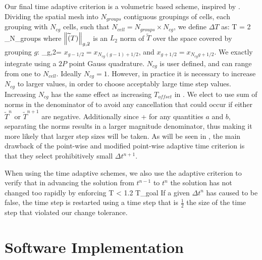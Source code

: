 Our final time adaptive criterion is a volumetric based scheme, inspired by .
Dividing the spatial mesh into $N_{groups}$ contiguous groupings of cells, each grouping with $N_{cg}$ cells, such that $N_{cell} = N_{groups} \times N_{cg}$, we define $\Delta T$ as:
\benum
\Delta T = 2 \max_{N_{groups}}  \pec
\label{eq:volumetric_adaptive}
\eenum
where $\left\lVert  \widetilde(T)  \right\rVert_{g,2}$ is an $L_2$ norm of $\widetilde{T}$ over the space covered by grouping $g$:
\benum
{}_{g,2}= \pec
\label{eq:group_integral}
\eenum
$x_{g-1/2} = x_{N_{cg} (g-1)+1/2}$, and $x_{g+1/2} = x_{N_{cg} g +1/2}$.  
We exactly integrate  using a $2P$ point Gauss quadrature.  
$N_{cg}$ is user defined, and can range from one to $N_{cell}$.
Ideally $N_{cg} = 1$.  However, in practice it is necessary to increase $N_{cg}$ to larger values, in order to choose acceptably large time step values.
Increasing $N_{cg}$ has the same effect as increasing $T_{offset}$ in .
We elect to use sum of norms in the denominator of  to avoid any cancellation that could occur if either $\widetilde{T}^n$ or $\widetilde{T}^{n+1}$ are negative.
Additionally since
\benum
{} \leq {} +  \pec
\eenum
for any quantities $a$ and $b$, separating the norms results in a larger magnitude denominator, thus making it more likely that larger step sizes will be taken.  
As will be seen in , the main drawback of the point-wise and modified point-wise adaptive time criterion is that they select prohibitively small $\Delta t^{n+1}$.

When using the time adaptive schemes, we also use the adaptive criterion to verify that in advancing the solution from $t^{n-1}$ to $t^n$ the solution has not changed too rapidly by enforcing
\benum
\Delta T < 1.2 \Delta T_{goal} \pep
\label{eq:eos_check}
\eenum
If a given $\Delta t^n$ has caused  to be false, the time step is restarted using a time step that is $\frac{1}{2}$ the size of the time step that violated our change tolerance.

 
\section{Software Implementation}
\label{sec:chap6_programming}

